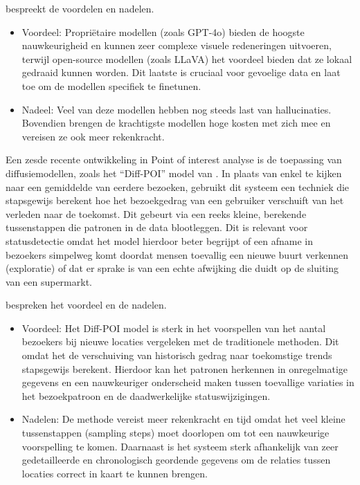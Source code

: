 \textcite{Singh2025} bespreekt de voordelen en nadelen.
\begin{itemize}
    \item Voordeel: Propriëtaire modellen (zoals GPT-4o) bieden de hoogste nauwkeurigheid en kunnen zeer complexe visuele redeneringen uitvoeren, terwijl open-source modellen (zoals LLaVA) het voordeel bieden dat ze lokaal gedraaid kunnen worden. Dit laatste is cruciaal voor gevoelige data en laat toe om de modellen specifiek te finetunen.
    \item Nadeel: Veel van deze modellen hebben nog steeds last van hallucinaties. Bovendien brengen de krachtigste modellen hoge kosten met zich mee en vereisen ze ook meer rekenkracht.
\end{itemize}

Een zesde recente ontwikkeling in Point of interest analyse is de toepassing van diffusiemodellen, zoals het “Diff-POI” model van \textcite{Qin2023}. In plaats van enkel te kijken naar een gemiddelde van eerdere bezoeken, gebruikt dit systeem een techniek die stapsgewijs berekent hoe het bezoekgedrag van een gebruiker verschuift van het verleden naar de toekomst. Dit gebeurt via een reeks kleine, berekende tussenstappen die patronen in de data blootleggen. Dit is relevant voor statusdetectie omdat het model hierdoor beter begrijpt of een afname in bezoekers simpelweg komt doordat mensen toevallig een nieuwe buurt verkennen (exploratie) of dat er sprake is van een echte afwijking die duidt op de sluiting van een supermarkt.

\textcite{Qin2023} bespreken het voordeel en de nadelen. 
\begin{itemize}   
    \item Voordeel: Het Diff-POI model is sterk in het voorspellen van het aantal bezoekers bij nieuwe locaties vergeleken met de traditionele methoden. Dit omdat het de verschuiving van historisch gedrag naar toekomstige trends stapsgewijs berekent. Hierdoor kan het patronen herkennen in onregelmatige gegevens en een nauwkeuriger onderscheid maken tussen toevallige variaties in het bezoekpatroon en de daadwerkelijke statuswijzigingen.
    
    \item Nadelen: De methode vereist meer rekenkracht en tijd omdat het veel kleine tussenstappen (sampling steps) moet doorlopen om tot een nauwkeurige voorspelling te komen. Daarnaast is het systeem sterk afhankelijk van zeer gedetailleerde en chronologisch geordende gegevens om de relaties tussen locaties correct in kaart te kunnen brengen.
\end{itemize}

